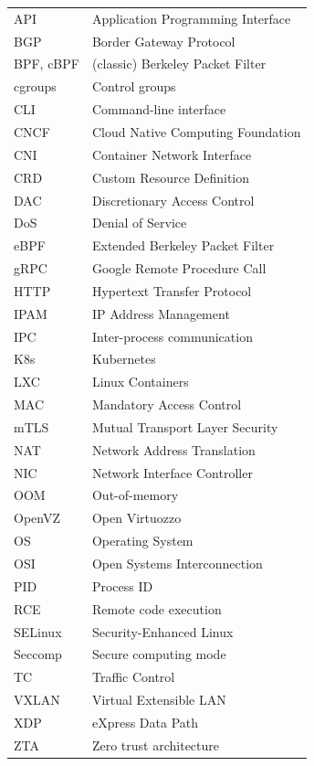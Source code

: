 \documentclass[english, 12pt, a4paper, sci, utf8, a-2b, online]{aaltothesis}
\begin{document}
\begin{tabular}{ll}
  API         & Application Programming Interface   \\
  BGP         & Border Gateway Protocol             \\
  BPF, cBPF   & (classic) Berkeley Packet Filter    \\
  cgroups     & Control groups                      \\
  CLI         & Command-line interface              \\
  CNCF        & Cloud Native Computing Foundation   \\
  CNI         & Container Network Interface         \\
  CRD         & Custom Resource Definition          \\
  DAC         & Discretionary Access Control        \\
  DoS         & Denial of Service                   \\
  eBPF        & Extended Berkeley Packet Filter     \\
  gRPC        & Google Remote Procedure Call        \\
  HTTP        & Hypertext Transfer Protocol         \\
  IPAM        & IP Address Management               \\
  IPC         & Inter-process communication         \\
  K8s         & Kubernetes                          \\
  LXC         & Linux Containers                    \\
  MAC         & Mandatory Access Control            \\
  mTLS        & Mutual Transport Layer Security     \\
  NAT         & Network Address Translation         \\
  NIC         & Network Interface Controller        \\
  OOM         & Out-of-memory                       \\
  OpenVZ      & Open Virtuozzo                      \\
  OS          & Operating System                    \\
  OSI         & Open Systems Interconnection        \\
  PID         & Process ID                          \\
  RCE         & Remote code execution               \\
  SELinux     & Security-Enhanced Linux             \\
  Seccomp     & Secure computing mode               \\
  TC          & Traffic Control                     \\
  VXLAN       & Virtual Extensible LAN              \\
  XDP         & eXpress Data Path                   \\
  ZTA         & Zero trust architecture             \\
\end{tabular}
\end{document}
